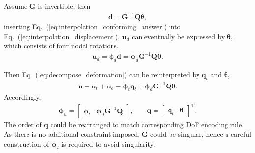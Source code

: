\documentclass[3p,sort&compress,review,11pt]{elsarticle}
\newcommand*{\mT}{\mathrm{T}}
\newcommand*{\eqsref}[1]{Eq.~(\ref{#1})}
\newcommand*{\mb}{\bm}
\begin{document}
Assume $\mb{G}$ is invertible, then
\begin{gather}\label{eq:interpolation_conforming_answer}
\mb{d}=\mb{G}^{-1}\mb{Q}\mb{\theta},
\end{gather}
inserting \eqsref{eq:interpolation_conforming_answer} into \eqsref{eq:interpolation_displacement}, $\mb{u}_d$ can eventually be expressed by $\mb{\theta}$, which consists of four nodal rotations.
\begin{gather}
\mb{u}_d=\mb{\phi}_d\mb{d}=\mb{\phi}_d\mb{G}^{-1}\mb{Q}\mb{\theta}.
\end{gather}

Then \eqsref{eq:decompose_deformation} can be reinterpreted by $\mb{q}_t$ and $\mb{\theta}$,
\begin{gather}
\mb{u}=\mb{u}_t+\mb{u}_d=\mb{\phi}_t\mb{q}_t+\mb{\phi}_d\mb{G}^{-1}\mb{Q}\mb{\theta}.
\end{gather}
Accordingly,
\begin{gather*}
\mb{\phi}_u=\begin{bmatrix}
\mb{\phi}_t&\mb{\phi}_d\mb{G}^{-1}\mb{Q}
\end{bmatrix},\qquad
\mb{q}=\begin{bmatrix}
\mb{q}_t&\mb{\theta}
\end{bmatrix}^\mT.
\end{gather*}
The order of $\mb{q}$ could be rearranged to match corresponding DoF encoding rule. As there is no additional constraint imposed, $\mb{G}$ could be singular, hence a careful construction of $\mb{\phi}_d$ is required to avoid singularity.
\end{document}
